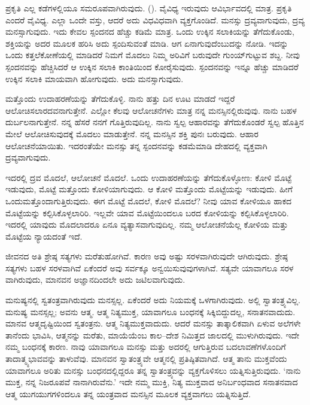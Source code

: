 ಪ್ರಕೃತಿ ಎಲ್ಲ ಕಡೆಗಳಲ್ಲಿಯೂ ಸಮರೂಪವಾಗಿರುವುದು. (). ವೈವಿಧ್ಯ ಇರುವುದು ಆವಿರ್ಭಾವದಲ್ಲಿ ಮಾತ್ರ. ಪ್ರಕೃತಿ ಎಂದರೆ ವೈವಿಧ್ಯ. ಎಲ್ಲಾ ಒಂದೇ ವಸ್ತು, ಆದರೆ ಅದು ವಿಧವಿಧವಾಗಿ ವ್ಯಕ್ತಗೊಂಡಿದೆ. ಮನಸ್ಸು ದ್ರವ್ಯವಾಗುವುದು, ದ್ರವ್ಯ ಮನಸ್ಸಾಗುವುದು. ಇದು ಕೇವಲ ಸ್ಪಂದನದ ಹೆಚ್ಚು ಕಡಿಮೆ ಮಾತ್ರ. ಒಂದು ಉಕ್ಕಿನ ಸಲಾಕಿಯನ್ನು ತೆಗೆದುಕೊಂಡು, ಶಕ್ತಿಯನ್ನು ಅದರ ಮೂಲಕ ಹರಿಸಿ ಅದು ಸ್ಪಂದಿಸುವಂತೆ ಮಾಡಿ. ಆಗ ಏನಾಗುವುದೆಂಬುದನ್ನು ನೋಡಿ. ಇದನ್ನು ಒಂದು ಕತ್ತಲೆಕೋಣೆಯಲ್ಲಿ ಮಾಡಿದರೆ ನಿಮಗೆ ಮೊದಲು ನಿಮ್ಮ ಅರಿವಿಗೆ ಬರುವುದೇ ಗುಂಯ್‌ಗುಟ್ಟುವ ಶಬ್ದ. ನೀವು ಸ್ಪಂದನವನ್ನು ಹೆಚ್ಚಿಸಿದರೆ ಆ ಉಕ್ಕಿನ ಸಲಾಕಿ ಕಾಂತಿಯಿಂದ ಕೋರೈಸುವುದು. ಸ್ಪಂದನವನ್ನು ಇನ್ನೂ ಹೆಚ್ಚು ಮಾಡಿದರೆ ಉಕ್ಕಿನ ಸಲಾಕಿ ಮಾಯವಾಗಿ ಹೋಗುವುದು. ಅದು ಮನಸ್ಸಾಗುವುದು.

ಮತ್ತೊಂದು ಉದಾಹರಣೆಯನ್ನು ತೆಗೆದುಕೊಳ್ಳಿ. ನಾನು ಹತ್ತು ದಿನ ಊಟ ಮಾಡದೆ ಇದ್ದರೆ ಆಲೋಚಿಸಲಾರದವನಾಗುತ್ತೇನೆ. ಎಲ್ಲೋ ಕೆಲವು ಆಲೋಚನೆಗಳು ಮಾತ್ರ ನನ್ನ ಮನಸ್ಸಿನಲ್ಲಿರುವುವು. ನಾನು ಬಹಳ ದುರ್ಬಲನಾಗುತ್ತೇನೆ. ನನ್ನ ಹೆಸರೆ ನನಗೆ ಗೊತ್ತಿರುವುದಿಲ್ಲ. ನಾನು ಸ್ವಲ್ಪ ಆಹಾರವನ್ನು ತೆಗೆದುಕೊಂಡರೆ ಸ್ವಲ್ಪ ಹೊತ್ತಿನ ಮೇಲೆ ಆಲೋಚಿಸುವುದಕ್ಕೆ ಮೊದಲು ಮಾಡುತ್ತೇನೆ. ನನ್ನ ಮನಸ್ಸಿನ ಶಕ್ತಿ ಪುನಃ ಬರುವುದು. ಆಹಾರ ಆಲೋಚನೆಯಾಯಿತು. ಇದರಂತೆಯೇ ಮನಸ್ಸು ತನ್ನ ಸ್ಪಂದನವನ್ನು ಕಡಮೆಮಾಡಿ ದೇಹದಲ್ಲಿ ವ್ಯಕ್ತವಾಗಿ ದ್ರವ್ಯವಾಗುವುದು.

ಇದರಲ್ಲಿ ದ್ರವ ಮೊದಲೆ, ಆಲೋಚನೆ ಮೊದಲೆ. ಒಂದು ಉದಾಹರಣೆಯನ್ನು ತೆಗೆದುಕೊಳ್ಳೋಣ: ಕೋಳಿ ಮೊಟ್ಟೆ ಇಡುವುದು, ಮೊಟ್ಟೆ ಮತ್ತೊಂದು ಕೋಳಿಯಾಗುವುದು. ಆ ಕೋಳಿ ಮತ್ತೊಂದು ಮೊಟ್ಟೆಯನ್ನು ಇಡುವುದು. ಹೀಗೆ ಒಂದು\break ಮತ್ತೊಂದಾಗುತ್ತಿರುವುದು. ಈಗ ಮೊಟ್ಟೆ ಮೊದಲೆ, ಕೋಳಿ ಮೊದಲೆ? ನೀವು ಯಾವ ಕೋಳಿಯೂ ಹಾಕದ ಮೊಟ್ಟೆಯನ್ನು ಕಲ್ಪಿಸಿಕೊಳ್ಳಲಾರಿರಿ. ಇಲ್ಲವೇ ಯಾವ ಮೊಟ್ಟೆಯಿಂದಲೂ ಬರದ ಕೋಳಿಯನ್ನು ಕಲ್ಪಿಸಿಕೊಳ್ಳಲಾರಿರಿ. ಇದರಲ್ಲಿ ಯಾವುದು ಮೊದಲಾದರೂ ಏನೂ ವ್ಯತ್ಯಾಸವಾಗುವುದಿಲ್ಲ. ನಮ್ಮ ಆಲೋಚನೆಯೆಲ್ಲ ಕೋಳಿಯ ಮತ್ತು ಮೊಟ್ಟೆಯ ನ್ಯಾಯದಂತೆ ಇದೆ.

ಜೀವನದ ಅತಿ ಶ್ರೇಷ್ಠ ಸತ್ಯಗಳು ಮರೆತುಹೋಗಿವೆ. ಕಾರಣ ಅವು ಅಷ್ಟು ಸರಳವಾಗಿರುವುದೇ ಆಗಿರುವುದು. ಶ್ರೇಷ್ಠ ಸತ್ಯಗಳು ಬಹಳ ಸರಳವಾಗಿವೆ ಏಕೆಂದರೆ ಅವು ಸರ್ವಕ್ಕೂ ಅನ್ವಯಿಸುವುವುಗಳಾಗಿವೆ. ಸತ್ಯವೇ ಯಾವಾಗಲೂ ಸರಳ ವಾಗಿರುವುದು, ಮಾನವನ ಅಜ್ಞಾನದಿಂದಲೇ ಅದು ಜಟಿಲವಾಗುವುದು.

ಮನುಷ್ಯನಲ್ಲಿ ಸ್ವತಂತ್ರವಾಗಿರುವುದು ಮನಸ್ಸಲ್ಲ. ಏಕೆಂದರೆ ಅದು ನಿಯಮಕ್ಕೆ ಒಳಗಾಗಿರುವುದು. ಅಲ್ಲಿ ಸ್ವಾತಂತ್ರ್ಯವಿಲ್ಲ. ಮನುಷ್ಯ ಮನಸ್ಸಲ್ಲ; ಅವನು ಆತ್ಮ. ಆತ್ಮ ನಿತ್ಯಮುಕ್ತ, ಯಾವಾಗಲೂ ಬಂಧನಕ್ಕೆ ಸಿಕ್ಕಿಬಿದ್ದುದಲ್ಲ, ಸನಾತನವಾದುದು. ಮಾನವ ಆತ್ಮದೃಷ್ಟಿಯಿಂದ ಸ್ವತಂತ್ರನು. ಆತ್ಮ ನಿತ್ಯಮುಕ್ತವಾದುದು. ಆದರೆ ಮನಸ್ಸು ತಾತ್ಕಾಲಿಕವಾಗಿ ಏಳುವ ಅಲೆಗಳೇ ತಾನೆಂದು ಭಾವಿಸಿ, ಆತ್ಮನನ್ನು ಮರೆತು, ಮಾಯೆಯೆಂಬ ಕಾಲ–ದೇಶ ನಿಮಿತ್ತದ ಜಾಲದಲ್ಲಿ ಮುಳುಗಿರುವುದು. ಇದೇ ನಮ್ಮ ಬಂಧನಕ್ಕೆ ಕಾರಣ. ನಾವು ಯಾವಾಗಲೂ ಮನಸ್ಸು ಮತ್ತು ಅದರಲ್ಲಿ ಆಗುತ್ತಿರುವ ಬದಲಾವಣೆಗಳೊಂದಿಗೆ ತಾದಾತ್ಮ್ಯಭಾವವನ್ನು ತಾಳುವೆವು. ಮಾನವನ ಸ್ವಾತಂತ್ರ್ಯವೇ ಆತ್ಮನಲ್ಲಿ ಪ್ರತಿಷ್ಠಿತವಾಗಿದೆ. ಆತ್ಮ ತಾನು ಮುಕ್ತವೆಂದು ಯಾವಾಗಲೂ ಅರಿತು ಮನಸ್ಸು ಬಂಧನದಲ್ಲಿದ್ದರೂ ತನ್ನ ಸ್ವಾತಂತ್ರ್ಯವನ್ನು ವ್ಯಕ್ತಗೊಳಿಸಲು ಯತ್ನಿಸುತ್ತಿರುವುದು. `ನಾನು ಮುಕ್ತ, ನನ್ನ ನಿಜರೂಪವೆ ನಾನಾಗಿರುವೆನು.' ಇದೇ ನಮ್ಮ ಮುಕ್ತಿ, ನಿತ್ಯ ಮುಕ್ತವಾದ ಅನಿರ್ಬಂಧವಾದ ಸನಾತನವಾದ ಆತ್ಮ ಯುಗಯುಗಗಳಿಂದಲೂ ತನ್ನ ಯಂತ್ರವಾದ ಮನಸ್ಸಿನ ಮೂಲಕ ವ್ಯಕ್ತವಾಗಲು ಯತ್ನಿಸುತ್ತಿದೆ.

